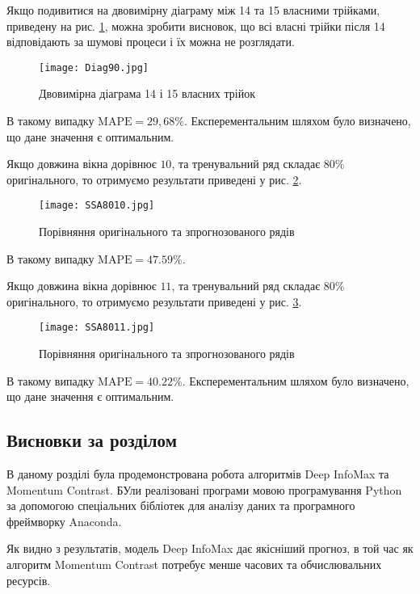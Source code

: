 Якщо подивитися на двовимірну діаграму між 14 та 15 власними трійками, приведену на рис. \ref{fig:Diag90}, можна зробити висновок, що всі власні трійки після 14 відповідають за шумові процеси і їх можна не розглядати.


\vspace{1em}

\begin{figure}[h]
  \texttt{[image: Diag90.jpg]}
  \caption{Двовимірна діаграма 14 і 15 власних трійок}
  \label{fig:Diag90}
\end{figure}

В такому випадку $\text{MAPE} = 29,68\%$. Експерементальним шляхом було визначено, що дане значення є оптимальним.

Якщо довжина вікна дорівнює $10$, та тренувальний ряд складає $80\%$ оригінального, то отримуємо результати приведені у рис. \ref{fig:SSA8010}.

\newpage

\vspace{1em}

\begin{figure}[h]
  \texttt{[image: SSA8010.jpg]}
  \caption{Порівняння оригінального та зпрогнозованого рядів}
  \label{fig:SSA8010}
\end{figure}

В такому випадку $\text{MAPE} = 47.59\%$.

Якщо довжина вікна дорівнює $11$, та тренувальний ряд складає $80\%$ оригінального, то отримуємо результати приведені у рис. \ref{fig:SSA8011}.

\begin{figure}[h]
  \texttt{[image: SSA8011.jpg]}
  \caption{Порівняння оригінального та зпрогнозованого рядів}
  \label{fig:SSA8011}
\end{figure}

В такому випадку $\text{MAPE} = 40.22\%$. Експерементальним шляхом було визначено, що дане значення є оптимальним.

\subsection{Висновки за розділом}

В даному розділі була продемонстрована робота алгоритмів Deep InfoMax та Momentum Contrast. БУли реалізовані програми мовою програмування Python за допомогою спеціальних бібліотек для аналізу даних та програмного фреймворку Anaconda. 

Як видно з результатів, модель Deep InfoMax дає якісніший прогноз, в той час як алгоритм Momentum Contrast потребує менше часових та обчислювальних ресурсів.
